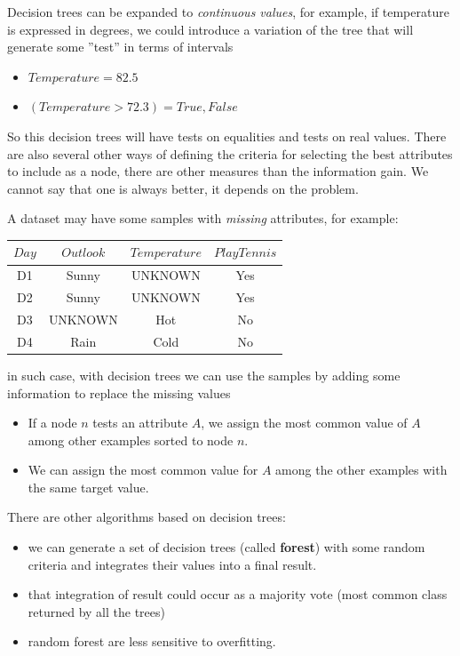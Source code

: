 \documentclass[10pt, letterpaper]{report}
\begin{document}
Decision trees can be expanded to \textit{continuous values}, for example, if temperature is expressed in degrees, we could introduce a variation of the tree that will generate some ''test'' in terms of intervals\begin{itemize}
    \item $Temperature=82.5$
    \item $(Temperature > 72.3) = True,False$
\end{itemize}
So this decision trees will have tests on equalities and tests on real values. There are also several other ways of defining the criteria for selecting the best attributes to include as a node, there are other measures than the information gain. We cannot say that one is always better, it depends on the problem.\bigskip 

A dataset may have some samples with \textit{missing} attributes, for example:\begin{center}
    \begin{tabular}{|c|c|c|c|}
        \hline
        {$Day$} & {$Outlook$} & {$Temperature$} & {$PlayTennis$} \\
        \hline
        D1 & Sunny & UNKNOWN & Yes \\
        \hline
        D2 & Sunny & UNKNOWN & Yes \\
        \hline
        D3 & UNKNOWN & Hot & No \\
        \hline
        D4 & Rain & Cold & No \\
        \hline
    \end{tabular}
\end{center}
in such case, with decision trees we can use the samples by adding some information to replace the missing values\begin{itemize}
    \item If a node $n$ tests an attribute $A$, we assign the most common value of $A$ among other examples sorted to node $n$.
    \item We can assign the most common value for $A$ among the other examples with the same target value.
\end{itemize}
There are other algorithms based on decision trees:\begin{itemize}
    \item we can generate a set of decision trees (called \textbf{forest}) with some random criteria and integrates their values into a final result.
    \item that integration of result could occur as a majority vote (most common class returned by all the trees)
    \item random forest are less sensitive to overfitting.
\end{itemize}
\end{document}
